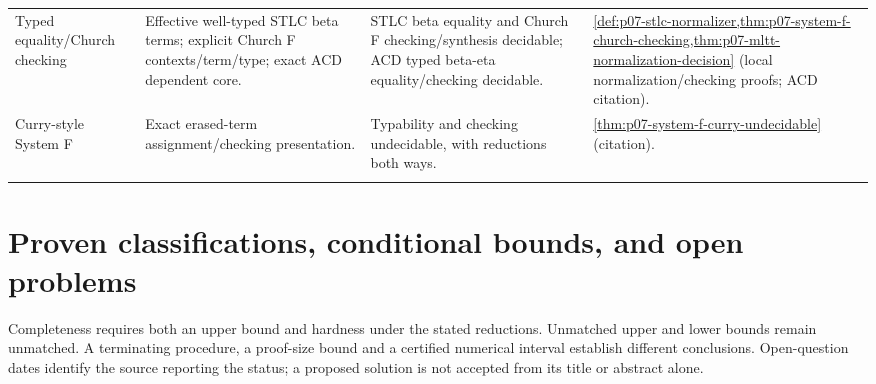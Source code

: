 \begin{landscape}
\begin{longtable}{@{}p{.18\linewidth}p{.25\linewidth}p{.23\linewidth}p{.26\linewidth}@{}}
Typed equality/Church checking & Effective well-typed STLC beta terms; explicit Church F contexts/term/type; exact ACD dependent core. & STLC beta equality and Church F checking/synthesis decidable; ACD typed beta-eta equality/checking decidable. & \cref{def:p07-stlc-normalizer,thm:p07-system-f-church-checking,thm:p07-mltt-normalization-decision} (local normalization/checking proofs; ACD citation).\\\addlinespace
Curry-style System F & Exact erased-term assignment/checking presentation. & Typability and checking undecidable, with reductions both ways. & \cref{thm:p07-system-f-curry-undecidable} (citation).\\\addlinespace
\end{longtable}
\endgroup
\end{landscape}

\section{Proven classifications, conditional bounds, and open problems}
\label{sec:p14-dc-standing}

Completeness requires both an upper bound and hardness under the stated
reductions. Unmatched upper and lower bounds remain unmatched. A terminating
procedure, a proof-size bound and a certified numerical interval establish
different conclusions. Open-question dates identify the source reporting the
status; a proposed solution is not accepted from its title or abstract alone.

